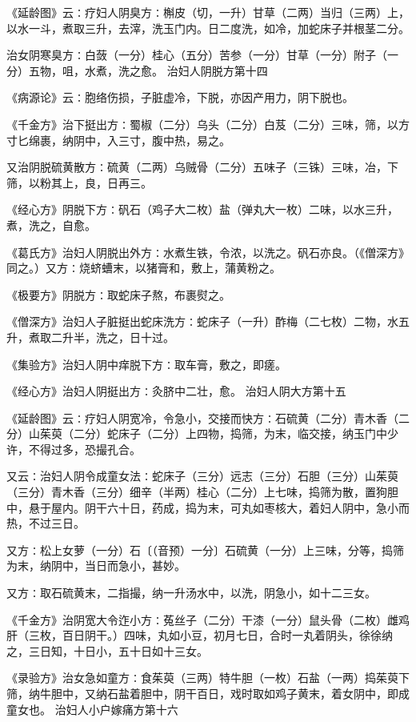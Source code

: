 \documentclass[a4paper,12pt,UTF8,twoside]{ctexbook}
\begin{document}
《延龄图》云∶疗妇人阴臭方∶槲皮（切，一升）甘草（二两）当归（三两）上，以水一斗，煮取三升，去滓，洗玉门内。日二度洗，如冷，加蛇床子并根茎二分。

治女阴寒臭方∶白蔹（一分）桂心（五分）苦参（一分）甘草（一分）附子（一分）五物，咀，水煮，洗之愈。
治妇人阴脱方第十四

《病源论》云∶胞络伤损，子脏虚冷，下脱，亦因产用力，阴下脱也。

《千金方》治下挺出方∶蜀椒（二分）乌头（二分）白芨（二分）三味，筛，以方寸匕绵裹，纳阴中，入三寸，腹中热，易之。

又治阴脱硫黄散方∶硫黄（二两）乌贼骨（二分）五味子（三铢）三味，冶，下筛，以粉其上，良，日再三。

《经心方》阴脱下方∶矾石（鸡子大二枚）盐（弹丸大一枚）二味，以水三升，煮，洗之，自愈。

《葛氏方》治妇人阴脱出外方∶水煮生铁，令浓，以洗之。矾石亦良。（《僧深方》同之。）又方∶烧蛴螬末，以猪膏和，敷上，蒲黄粉之。

《极要方》阴脱方∶取蛇床子熬，布裹熨之。

《僧深方》治妇人子脏挺出蛇床洗方∶蛇床子（一升）酢梅（二七枚）二物，水五升，煮取二升半，洗之，日十过。

《集验方》治妇人阴中痒脱下方∶取车膏，敷之，即瘥。

《经心方》治妇人阴挺出方∶灸脐中二壮，愈。
治妇人阴大方第十五

《延龄图》云∶疗妇人阴宽冷，令急小，交接而快方∶石硫黄（二分）青木香（二分）山茱萸（二分）蛇床子（二分）上四物，捣筛，为末，临交接，纳玉门中少许，不得过多，恐撮孔合。

又云∶治妇人阴令成童女法∶蛇床子（三分）远志（三分）石胆（三分）山茱萸（三分）青木香（三分）细辛（半两）桂心（二分）上七味，捣筛为散，置狗胆中，悬于屋内。阴干六十日，药成，捣为末，可丸如枣核大，着妇人阴中，急小而热，不过三日。

又方∶松上女萝（一分）石〔（音预）一分〕石硫黄（一分）上三味，分等，捣筛为末，纳阴中，当日而急小，甚妙。

又方∶取石硫黄末，二指撮，纳一升汤水中，以洗，阴急小，如十二三女。

《千金方》治阴宽大令迮小方∶菟丝子（二分）干漆（一分）鼠头骨（二枚）雌鸡肝（三枚，百日阴干。）四味，丸如小豆，初月七日，合时一丸着阴头，徐徐纳之，三日知，十日小，五十日如十三女。

《录验方》治女急如童方∶食茱萸（三两）特牛胆（一枚）石盐（一两）捣茱萸下筛，纳牛胆中，又纳石盐着胆中，阴干百日，戏时取如鸡子黄末，着女阴中，即成童女也。
治妇人小户嫁痛方第十六
\end{document}

